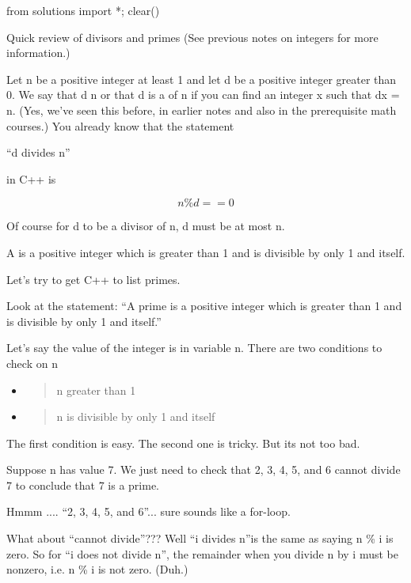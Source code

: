 \begin{python0}
from solutions import *; clear()
\end{python0}

Quick review of divisors and primes (See previous notes on integers for
more information.)

Let n be a positive integer at least 1 and let d be a positive integer
greater than 0. We say that d  n or that d is a
 of n if you can find an integer x such that dx = n.
(Yes, we've seen this before, in earlier notes and also
in the prerequisite math courses.) You already know that the statement
\begin{center}
``d divides n''
\end{center}
in C++ is

\[n \% d == 0\]

Of course for d to be a divisor of n, d must be at most n.

A  is a positive integer which is greater than 1 and is
divisible by only 1 and itself.

Let's try to get C++ to list primes.

Look at the statement: ``A prime is a positive integer which is greater
than 1 and is divisible by only 1 and itself.''

Let's say the value of the integer is in variable n.
There are two conditions to check on n

\begin{itemize}
\item
  \begin{quote}
  n greater than 1
  \end{quote}
\item
  \begin{quote}
  n is divisible by only 1 and itself
  \end{quote}
\end{itemize}

The first condition is easy. The second one is tricky. But its not too
bad.

Suppose n has value 7. We just need to check that 2, 3, 4, 5, and 6
cannot divide 7 to conclude that 7 is a prime.

Hmmm .... ``2, 3, 4, 5, and 6''... sure sounds like a for-loop.

What about ``cannot divide''??? Well ``i divides n''is the same as
saying n \% i is zero. So for ``i does not divide n'', the remainder
when you divide n by i must be nonzero, i.e. n \% i is not zero. (Duh.)

